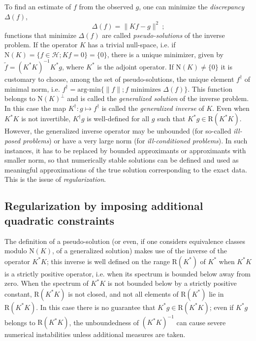 \documentclass[10pt]{article}
\def\cH{\mathcal{H}}
\def\mR{\mbox{R}}
\def\mN{\mbox{N}}
\def\K{K^*}
\begin{document}
To find an estimate of $f$ from the observed $g$, one can minimize
the {\it discrepancy} $\Delta(f)$,
\begin{equation*}
\Delta(f)=\| Kf-g \|^2\ ;
\end{equation*}
functions that minimize $\Delta(f)$ are called {\em pseudo-solutions}
of the inverse problem. If the operator $K$ has a trivial null-space,
i.e. if $\mN(K)=\{f \in \cH ; Kf=0\}=\{0\}$, there is a unique minimizer, given
by
$\widetilde{f}=(K^*K)^{-1}K^*g$, where $K^*$ is the adjoint operator. If
$\mN(K)\neq
\{0\}$ it is customary to choose, among the set of pseudo-solutions, the unique
element
$f^\dagger$ of minimal norm,
i.e. $f^\dagger = \mbox{arg-min}\{\|f\|; f \mbox{ minimizes }
\Delta(f)\}$.
This function belongs to $\mN(K)^\perp$ and is called the {\it generalized
solution}
 of
the inverse problem. In this case the map $K^\dagger:
g \mapsto f^\dagger$
is called the {\it
generalized inverse } of $K$. Even when $K^*K$ is not invertible,
$K^\dagger g $ is
well-defined for all $g$ such that $K^*g \in \mR(K^*K)$.
 However, the generalized inverse operator may be
unbounded (for so-called {\it ill-posed problems}) or have a very large norm
(for {\it ill-conditioned problems}). In such instances, it has to be replaced
by bounded approximants or approximants with smaller norm, so
that numerically stable solutions can be defined and used as meaningful
approximations of the true solution corresponding to the exact data.
This is the issue of {\it regularization}.

\subsection{Regularization by imposing additional quadratic constraints}

The definition of a pseudo-solution (or even, if one considers equivalence
classes modulo $\mN(K)$, of a generalized solution) makes use of
the inverse of the operator $K^*K$; this inverse is well defined on
the range $\mR(K^*)$ of $\K $ when $K^*K$ is a strictly
positive operator, i.e. when its spectrum is bounded below away from zero.
When the spectrum of $K^*K$ is not bounded below by a strictly positive
constant, $\mR(K^*K)$ is not closed, and not all elements of $\mR(\K )$ lie
in $\mR(\K K)$. In this case there is no guarantee
that $K^*g
\in \mR(\K K)$; even if $K^*g$ belongs to $\mR(\K K)$, the unboundedness of
$(\K K)^{-1}$ can cause severe numerical instabilities unless
additional measures are taken.
\end{document}
